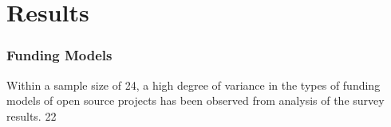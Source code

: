 \section{Results}

\subsubsection{Funding Models}
Within a sample size of 24, a high degree of variance in the types of funding models of open source projects has been observed from analysis of the survey results. 22%
